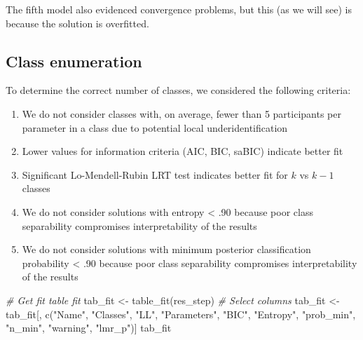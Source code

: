 \documentclass[
  man,floatsintext]{apa6}
\newenvironment{Shaded}{\begin{snugshade}}{\end{snugshade}}
\newcommand{\CommentTok}[1]{\textcolor[rgb]{0.56,0.35,0.01}{\textit{#1}}}
\newcommand{\FunctionTok}[1]{\textcolor[rgb]{0.00,0.00,0.00}{#1}}
\newcommand{\NormalTok}[1]{#1}
\newcommand{\OtherTok}[1]{\textcolor[rgb]{0.56,0.35,0.01}{#1}}
\newcommand{\StringTok}[1]{\textcolor[rgb]{0.31,0.60,0.02}{#1}}
\providecommand{\tightlist}{%
  \setlength{\itemsep}{0pt}\setlength{\parskip}{0pt}}
\begin{document}
The fifth model also evidenced convergence problems, but this (as we
will see) is because the solution is overfitted.

\hypertarget{class-enumeration}{%
\subsection{Class enumeration}\label{class-enumeration}}

To determine the correct number of classes, we considered the following
criteria:

\begin{enumerate}
\def\labelenumi{\arabic{enumi}.}
\tightlist
\item
  We do not consider classes with, on average, fewer than 5
  participants per parameter in a class due to potential local
  underidentification
\item
  Lower values for information criteria (AIC, BIC, saBIC) indicate
  better fit
\item
  Significant Lo-Mendell-Rubin LRT test indicates better fit for \(k\)
  vs \(k-1\) classes
\item
  We do not consider solutions with entropy \textless{} .90 because poor class
  separability compromises interpretability of the results
\item
  We do not consider solutions with minimum posterior classification
  probability \textless{} .90 because poor class separability compromises
  interpretability of the results
\end{enumerate}

\begin{Shaded}
\begin{Highlighting}[]
\CommentTok{\# Get fit table fit}
\NormalTok{tab\_fit }\OtherTok{\textless{}{-}} \FunctionTok{table\_fit}\NormalTok{(res\_step)}
\CommentTok{\# Select columns}
\NormalTok{tab\_fit }\OtherTok{\textless{}{-}}\NormalTok{ tab\_fit[, }\FunctionTok{c}\NormalTok{(}\StringTok{"Name"}\NormalTok{, }\StringTok{"Classes"}\NormalTok{, }\StringTok{"LL"}\NormalTok{, }\StringTok{"Parameters"}\NormalTok{, }\StringTok{"BIC"}\NormalTok{, }\StringTok{"Entropy"}\NormalTok{, }\StringTok{"prob\_min"}\NormalTok{, }\StringTok{"n\_min"}\NormalTok{, }\StringTok{"warning"}\NormalTok{, }\StringTok{"lmr\_p"}\NormalTok{)]}
\NormalTok{tab\_fit}
\end{Highlighting}
\end{Shaded}
\end{document}
